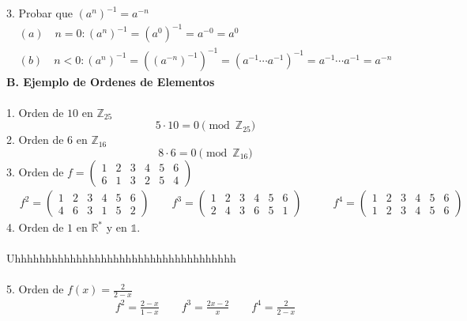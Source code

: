 \documentclass{article}
\begin{document}
3. Probar que $(a^{n})^{-1}=a^{-n}$
\begin{equation*}
\begin{aligned}
    (a) \quad n=0: (a^{n})^{-1} = (a^{0})^{-1}=a^{-0}=a^{0} \\
    (b) \quad n<0: (a^{n})^{-1} = ((a^{-n})^{-1})^{-1} = (a^{-1} \cdots a^{-1})^{-1} = a^{-1} \cdots a^{-1} = a^{-n}
\end{aligned}
\end{equation*}
\textbf{B. Ejemplo de Ordenes de Elementos}
\\
\\
1. Orden de $10$ en $\mathbb{Z}_{25}$
\begin{equation*}
    5 \cdot 10 = 0 \pmod{\mathbb{Z}_{25}}
\end{equation*}
2. Orden de $6$ en $\mathbb{Z}_{16}$
\begin{equation*}
    8 \cdot 6 = 0 \pmod{\mathbb{Z}_{16}}
\end{equation*}
3. Orden de $f = \begin{pmatrix}
1 & 2 & 3 & 4 & 5 & 6\\
6 & 1 & 3 & 2 & 5 & 4
\end{pmatrix}$
\begin{equation*}
\begin{aligned}
    &f^{2} = \begin{pmatrix}         
1 & 2 & 3 & 4 & 5 & 6\\
4 & 6 & 3 & 1 & 5 & 2
\end{pmatrix} \quad \quad f^{3}=\begin{pmatrix}
1 & 2 & 3 & 4 & 5 & 6\\
2 & 4 & 3 & 6 & 5 & 1
\end{pmatrix} \quad \quad
&f^{4}= \begin{pmatrix}
1 & 2 & 3 & 4 & 5 & 6\\
1 & 2 & 3 & 4 & 5 & 6
\end{pmatrix}
\end{aligned}
\end{equation*}
4. Orden de $1$ en $\mathbb{R}^{*}$ y en $\mathbb{1}$.
\\
\\
Uhhhhhhhhhhhhhhhhhhhhhhhhhhhhhhhhhhhh 
\\
\\
5. Orden de $f(x)=\frac{2}{2-x}$
\begin{equation*}
\begin{aligned}
    f^{2}=\frac{2-x}{1-x} \quad \quad f^{3}=\frac{2x-2}{x} \quad \quad f^{4}= \frac{2}{2-x}
\end{aligned}
\end{equation*}
\end{document}
